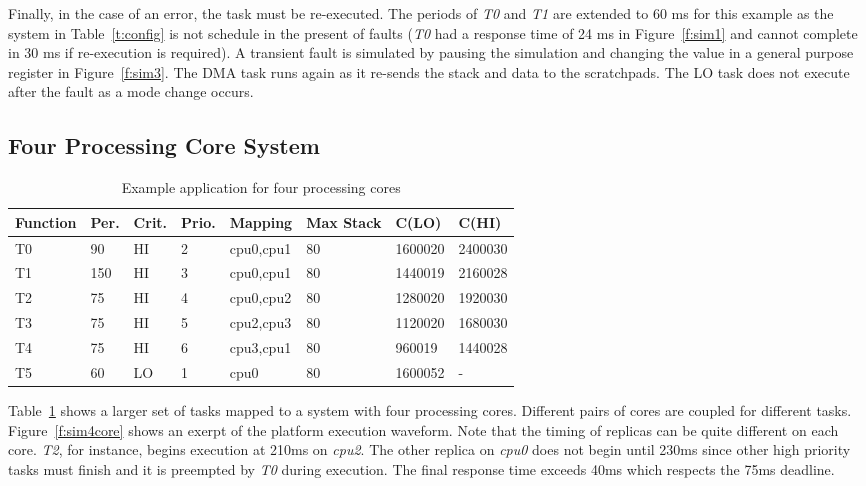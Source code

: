 		
	Finally, in the case of an error, the task must be re-executed. 
	The periods of \emph{T0} and \emph{T1} are extended to 60 ms for this example as the system in Table~\ref{t:config} is not schedule in the present of faults (\emph{T0} had a response time of 24 ms in Figure~\ref{f:sim1} and cannot complete in 30 ms if re-execution is required).
	A transient fault is simulated by pausing the simulation and changing the value in a general purpose register in Figure~\ref{f:sim3}. 
	The DMA task runs again as it re-sends the stack and data to the scratchpads.
	The LO task does not execute after the fault as a mode change occurs.
	
		 

\subsection{Four Processing Core System}

\begin{table}[h]
\caption{Example application for four processing cores}
\centering

	\begin{tabular}{@{}llllllll@{}}
	Function & Per. & Crit. & Prio. & Mapping & Max Stack & C(LO) & C(HI) 	 \\
	
	\toprule
	T0 & 90 & HI & 2 & cpu0,cpu1 & 80 & 1600020 & 2400030 \\
	T1 & 150 & HI & 3 & cpu0,cpu1 & 80 & 1440019 & 2160028 \\
	T2 & 75 & HI & 4 & cpu0,cpu2 & 80 & 1280020 & 1920030 \\
	T3 & 75 & HI & 5 & cpu2,cpu3 & 80 & 1120020 & 1680030 \\
	T4 & 75 & HI & 6 & cpu3,cpu1 & 80 & 960019 & 1440028 \\
	T5 & 60 & LO & 1 & cpu0 & 80 & 1600052 & - \\
	\end{tabular}

\label{t:dcc}
\end{table}

	Table~\ref{t:dcc} shows a larger set of tasks mapped to a system with four processing cores. 
	Different pairs of cores are coupled for different tasks. 
	Figure~\ref{f:sim4core} shows an exerpt of the platform execution waveform. 
	Note that the timing of replicas can be quite different on each core.
	\emph{T2}, for instance, begins execution at 210ms on \emph{cpu2}.
	The other replica on \emph{cpu0} does not begin until 230ms since other high priority tasks must finish 
	and it is preempted by \emph{T0} during execution. 
	The final response time exceeds 40ms which respects the 75ms deadline.
	
